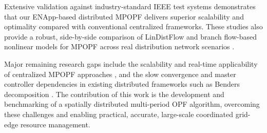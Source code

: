 Extensive validation against industry-standard IEEE test systems demonstrates that our ENApp-based distributed MPOPF delivers superior scalability and optimality compared with conventional centralized frameworks. These studies also provide a robust, side-by-side comparison of LinDistFlow and branch flow-based nonlinear models for MPOPF across real distribution network scenarios \cite{Jha2024}.

Major remaining research gaps include the scalability and real-time applicability of centralized MPOPF approaches \cite{Gabash, ddp_sugar_01, mpopf2021, mpopfstorage2021, largevopfw2021}, and the slow convergence and master controller dependencies in existing distributed frameworks such as Benders decomposition \cite{Wu}. The contribution of this work is the development and benchmarking of a spatially distributed multi-period OPF algorithm, overcoming these challenges and enabling practical, accurate, large-scale coordinated grid-edge resource management.

